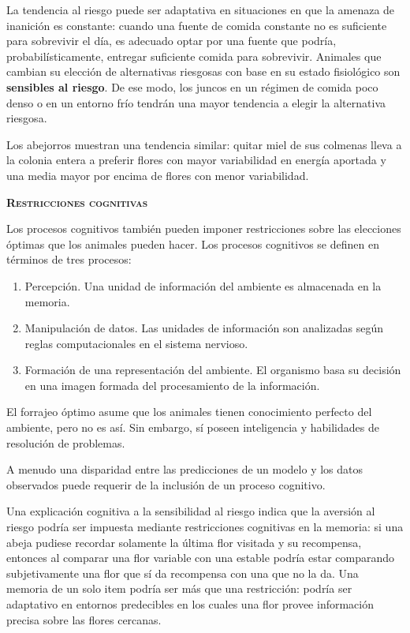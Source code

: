 \documentclass[a4paper,12pt]{article}
\begin{document}
La tendencia al riesgo puede ser adaptativa en situaciones en que la amenaza de inanición es constante: cuando una fuente de comida constante no es suficiente para sobrevivir el día, es adecuado optar por una fuente que podría, probabilísticamente, entregar suficiente comida para sobrevivir. Animales que cambian su elección de alternativas riesgosas con base en su estado fisiológico son {\bfseries sensibles al riesgo}. De ese modo, los juncos en un régimen de comida poco denso o en un entorno frío tendrán una mayor tendencia a elegir la alternativa riesgosa.

Los abejorros muestran una tendencia similar: quitar miel de sus colmenas lleva a la colonia entera a preferir flores con mayor variabilidad en energía aportada y una media mayor por encima de flores con menor variabilidad.

{\scshape\bfseries Restricciones cognitivas}

Los procesos cognitivos también pueden imponer restricciones sobre las elecciones óptimas que los animales pueden hacer. Los procesos cognitivos se definen en términos de tres procesos:
\begin{enumerate}
    \item Percepción. Una unidad de información del ambiente es almacenada en la memoria.
    \item Manipulación de datos. Las unidades de información son analizadas según reglas computacionales en el sistema nervioso.
    \item Formación de una representación del ambiente. El organismo basa su decisión en una imagen formada del procesamiento de la información.
\end{enumerate}

El forrajeo óptimo asume que los animales tienen conocimiento perfecto del ambiente, pero no es así. Sin embargo, sí poseen inteligencia y habilidades de resolución de problemas.

A menudo una disparidad entre las predicciones de un modelo y los datos observados puede requerir de la inclusión de un proceso cognitivo.

Una explicación cognitiva a la sensibilidad al riesgo indica que la aversión al riesgo podría ser impuesta mediante restricciones cognitivas en la memoria: si una abeja pudiese recordar solamente la última flor visitada y su recompensa, entonces al comparar una flor variable con una estable podría estar comparando subjetivamente una flor que sí da recompensa con una que no la da. Una memoria de un solo item podría ser más que una restricción: podría ser adaptativo en entornos predecibles en los cuales una flor provee información precisa sobre las flores cercanas.
\end{document}
